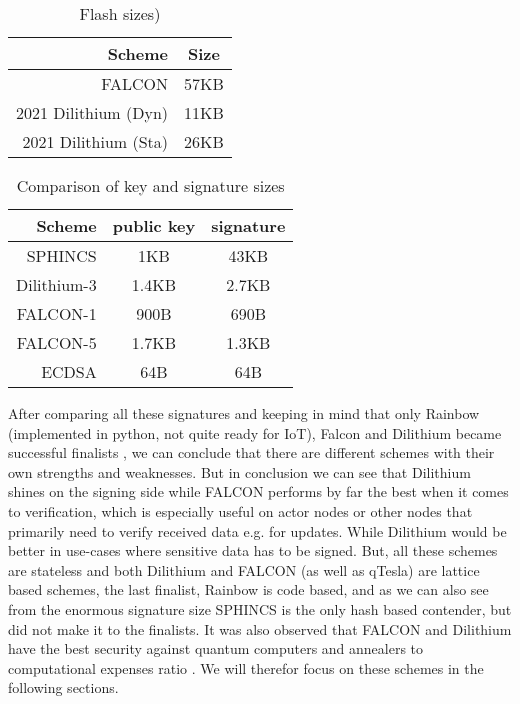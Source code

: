 \documentclass[conference]{IEEEtran}
\begin{document}
\begin{table}%
    \caption{Flash sizes)}
    \label{t:flashsize_comp}
    \centering\begin{tabular}{| r | c |}
        \hline
        Scheme & Size \\
        \hline
        FALCON & 57KB \\
        2021 Dilithium (Dyn) & 11KB\\
        2021 Dilithium (Sta) & 26KB\\
        \hline
    \end{tabular}
\end{table}

\begin{table}%
    \caption{Comparison of key and signature sizes}
    \label{t:key_sig_comp}
    \centering\begin{tabular}{ | r | c c | }
        \hline
        Scheme & public key & signature \\
        \hline
        SPHINCS     & 1KB   & 43KB \\
        Dilithium-3 & 1.4KB & 2.7KB\\
        FALCON-1    & 900B  & 690B\\
        FALCON-5    & 1.7KB & 1.3KB\\
        \hline
        ECDSA       & 64B   & 64B\\
        \hline
    \end{tabular}
\end{table}

After comparing all these signatures and keeping in mind that only Rainbow (implemented in python, not quite ready for IoT), Falcon and Dilithium became successful finalists \cite{nist_finalists_website}, we can conclude that there are different schemes with their own strengths and weaknesses.
But in conclusion we can see that Dilithium shines on the signing side while FALCON performs by far the best when it comes to verification, which is especially useful on actor nodes or other nodes that primarily need to verify received data e.g. for updates.
While Dilithium would be better in use-cases where sensitive data has to be signed.
But, all these schemes are stateless and both Dilithium and FALCON (as well as qTesla) are lattice based schemes, the last finalist, Rainbow is code based, and as we can also see from the enormous signature size SPHINCS is the only hash based contender, but did not make it to the finalists.
It was also observed that FALCON and Dilithium have the best security against quantum computers and annealers to computational expenses ratio \cite{springer_security_analyses}. We will therefor focus on these schemes in the following sections.
\end{document}
